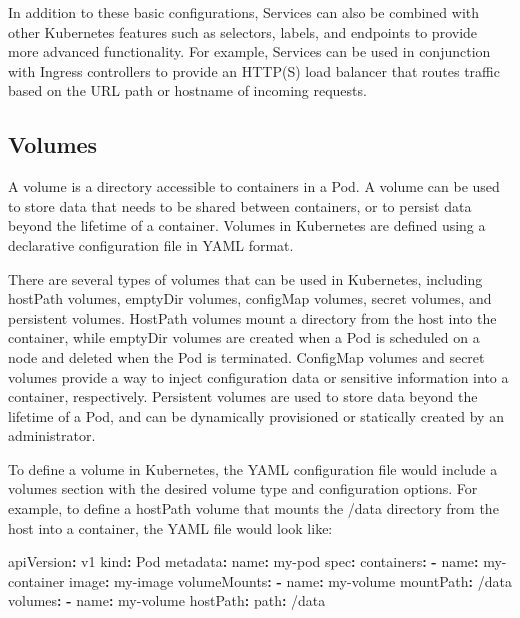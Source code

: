 \documentclass[
  11pt,
]{article}
\newenvironment{Shaded}{}{}
\newcommand{\AttributeTok}[1]{\textcolor[rgb]{0.49,0.56,0.16}{#1}}
\newcommand{\FunctionTok}[1]{\textcolor[rgb]{0.02,0.16,0.49}{#1}}
\newcommand{\KeywordTok}[1]{\textcolor[rgb]{0.00,0.44,0.13}{\textbf{#1}}}
\begin{document}
In addition to these basic configurations, Services can also be combined
with other Kubernetes features such as selectors, labels, and endpoints
to provide more advanced functionality. For example, Services can be
used in conjunction with Ingress controllers to provide an HTTP(S) load
balancer that routes traffic based on the URL path or hostname of
incoming requests.

\hypertarget{volumes}{%
\subsection{Volumes}\label{volumes}}

A volume is a directory accessible to containers in a Pod. A volume can
be used to store data that needs to be shared between containers, or to
persist data beyond the lifetime of a container. Volumes in Kubernetes
are defined using a declarative configuration file in YAML format.

There are several types of volumes that can be used in Kubernetes,
including hostPath volumes, emptyDir volumes, configMap volumes, secret
volumes, and persistent volumes. HostPath volumes mount a directory from
the host into the container, while emptyDir volumes are created when a
Pod is scheduled on a node and deleted when the Pod is terminated.
ConfigMap volumes and secret volumes provide a way to inject
configuration data or sensitive information into a container,
respectively. Persistent volumes are used to store data beyond the
lifetime of a Pod, and can be dynamically provisioned or statically
created by an administrator.

To define a volume in Kubernetes, the YAML configuration file would
include a volumes section with the desired volume type and configuration
options. For example, to define a hostPath volume that mounts the /data
directory from the host into a container, the YAML file would look like:

\begin{Shaded}
\begin{Highlighting}[]

\FunctionTok{apiVersion}\KeywordTok{:}\AttributeTok{ v1}
\FunctionTok{kind}\KeywordTok{:}\AttributeTok{ Pod}
\FunctionTok{metadata}\KeywordTok{:}
\AttributeTok{  }\FunctionTok{name}\KeywordTok{:}\AttributeTok{ my{-}pod}
\FunctionTok{spec}\KeywordTok{:}
\AttributeTok{  }\FunctionTok{containers}\KeywordTok{:}
\AttributeTok{  }\KeywordTok{{-}}\AttributeTok{ }\FunctionTok{name}\KeywordTok{:}\AttributeTok{ my{-}container}
\AttributeTok{    }\FunctionTok{image}\KeywordTok{:}\AttributeTok{ my{-}image}
\AttributeTok{    }\FunctionTok{volumeMounts}\KeywordTok{:}
\AttributeTok{    }\KeywordTok{{-}}\AttributeTok{ }\FunctionTok{name}\KeywordTok{:}\AttributeTok{ my{-}volume}
\AttributeTok{      }\FunctionTok{mountPath}\KeywordTok{:}\AttributeTok{ /data}
\AttributeTok{  }\FunctionTok{volumes}\KeywordTok{:}
\AttributeTok{  }\KeywordTok{{-}}\AttributeTok{ }\FunctionTok{name}\KeywordTok{:}\AttributeTok{ my{-}volume}
\AttributeTok{    }\FunctionTok{hostPath}\KeywordTok{:}
\AttributeTok{      }\FunctionTok{path}\KeywordTok{:}\AttributeTok{ /data}
\end{Highlighting}
\end{Shaded}
\end{document}
